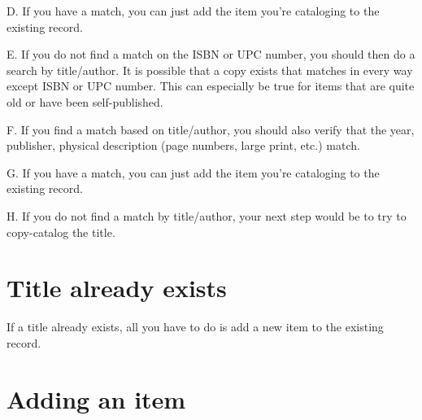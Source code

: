 \documentclass[letterpaper,10pt,english]{sphinxmanual}
\begin{document}
\noindent{}

\noindent{}

D. If you have a match, you can just add the item you’re cataloging to
the existing record.


E. If you do not find a match on the ISBN or UPC number, you should then
do a search by title/author. It is possible that a copy exists that
matches in every way except ISBN or UPC number. This can especially be
true for items that are quite old or have been self-published.

\noindent{}

F. If you find a match based on title/author, you should also verify
that the year, publisher, physical description (page numbers, large
print, etc.) match.

\noindent{}

\noindent{}

G. If you have a match, you can just add the item you’re cataloging to
the existing record.


H. If you do not find a match by title/author, your next step would be
to try to copy-catalog the title.



\chapter{Title already exists}
\label{\detokenize{title-already-exists/README:title-already-exists}}\label{\detokenize{title-already-exists/README::doc}}
If a title already exists, all you have to do is add a new item to the
existing record.


\chapter{Adding an item}
\label{\detokenize{title-already-exists/adding-an-item:adding-an-item}}\label{\detokenize{title-already-exists/adding-an-item::doc}}
\end{document}
